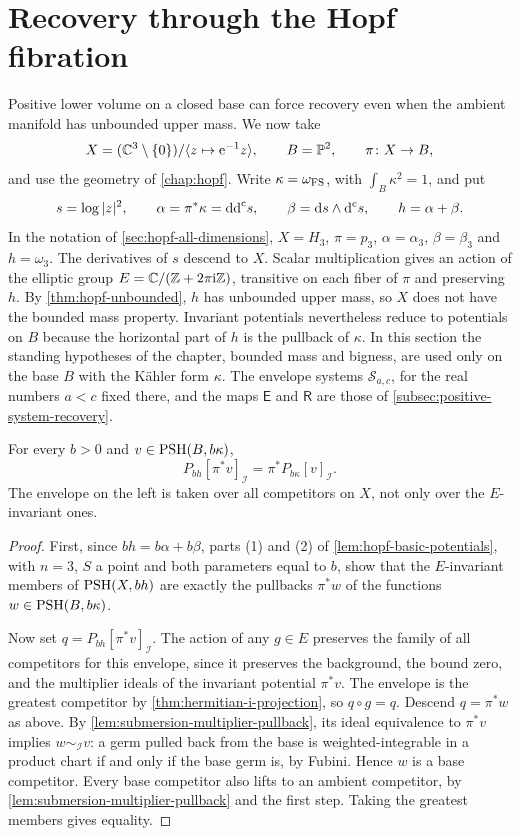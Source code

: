 \section{Recovery through the Hopf fibration}
\label{sec:hopf-transverse-recovery}

Positive lower volume on a closed base can force recovery even when the ambient manifold has unbounded upper mass. We now take
\[
 X=(\mathbb C^3\setminus\{0\})/\langle z\mapsto\mathrm e^{-1}z\rangle,
 \qquad B=\mathbb P^2,\qquad \pi\colon X\to B,
\]
and use the geometry of \cref{chap:hopf}. Write $\kappa=\omega_{\mathrm{FS}}$, with $\int_B\kappa^2=1$, and put
\[
 s=\log|z|^2,\qquad
 \alpha=\pi^*\kappa=\mathrm{dd}^{\mathrm{c}} s,\qquad
 \beta=\mathrm ds\wedge\mathrm d^{\mathrm c} s,\qquad h=\alpha+\beta.
\]
In the notation of \cref{sec:hopf-all-dimensions}, $X=H_3$, $\pi=p_3$, $\alpha=\alpha_3$, $\beta=\beta_3$ and $h=\omega_3$. The derivatives of $s$ descend to $X$. Scalar multiplication gives an action of the elliptic group $E=\mathbb C/(\mathbb Z+2\pi\mathrm i\mathbb Z)$, transitive on each fiber of $\pi$ and preserving $h$. By \cref{thm:hopf-unbounded}, $h$ has unbounded upper mass, so $X$ does not have the bounded mass property. Invariant potentials nevertheless reduce to potentials on $B$ because the horizontal part of $h$ is the pullback of $\kappa$. In this section the standing hypotheses of the chapter, bounded mass and bigness, are used only on the base $B$ with the K\"ahler form $\kappa$. The envelope systems $\mathscr S_{a,c}$, for the real numbers $a<c$ fixed there, and the maps $\mathsf E$ and $\mathsf R$ are those of \cref{subsec:positive-system-recovery}.

\begin{proposition}\label{prop:hopf-fiber-ideal-envelope}
For every $b>0$ and $v\in\mathrm{PSH}(B,b\kappa)$,
\[
 P_{bh}[\pi^*v]_{\mathcal I}
       =\pi^*P_{b\kappa}[v]_{\mathcal I}.
\]
The envelope on the left is taken over all competitors on $X$, not only over the $E$-invariant ones.
\end{proposition}
\begin{proof}
First, since $bh=b\alpha+b\beta$, parts (1) and (2) of \cref{lem:hopf-basic-potentials}, with $n=3$, $S$ a point and both parameters equal to $b$, show that the $E$-invariant members of $\mathrm{PSH}(X,bh)$ are exactly the pullbacks $\pi^*w$ of the functions $w\in\mathrm{PSH}(B,b\kappa)$.

Now set $q=P_{bh}[\pi^*v]_{\mathcal I}$. The action of any $g\in E$ preserves the family of all competitors for this envelope, since it preserves the background, the bound zero, and the multiplier ideals of the invariant potential $\pi^*v$. The envelope is the greatest competitor by \cref{thm:hermitian-i-projection}, so $q\circ g=q$. Descend $q=\pi^*w$ as above. By \cref{lem:submersion-multiplier-pullback}, its ideal equivalence to $\pi^*v$ implies $w\sim_{\mathcal I}v$: a germ pulled back from the base is weighted-integrable in a product chart if and only if the base germ is, by Fubini. Hence $w$ is a base competitor. Every base competitor also lifts to an ambient competitor, by \cref{lem:submersion-multiplier-pullback} and the first step. Taking the greatest members gives equality.
\end{proof}

